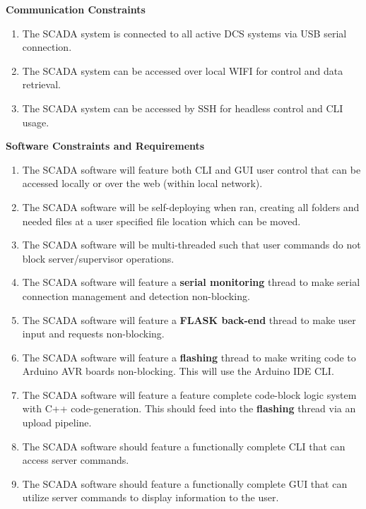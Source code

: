 \documentclass[../main.tex]{subfiles}
\begin{document}
\noindent\textbf{Communication Constraints}
\begin{enumerate}[label=\arabic*.]

\item The SCADA system is connected to all active DCS systems via USB serial connection.
\item The SCADA system can be accessed over local WIFI for control and data retrieval.
\item The SCADA system can be accessed by SSH for headless control and CLI usage.

\end{enumerate}

\noindent\textbf{Software Constraints and Requirements}
\begin{enumerate}[label=\arabic*.]

\item The SCADA software will feature both CLI and GUI user control that can be accessed locally or over the web (within local network).
\item The SCADA software will be self-deploying when ran, creating all folders and needed files at a user specified file location which can be moved.
\item The SCADA software will be multi-threaded such that user commands do not block server/supervisor operations.
\item The SCADA software will feature a \textbf{serial monitoring} thread to make serial connection management and detection non-blocking.
\item The SCADA software will feature a \textbf{FLASK back-end} thread to make user input and requests non-blocking.
\item The SCADA software will feature a \textbf{flashing} thread to make writing code to Arduino AVR boards non-blocking. This will use the Arduino IDE CLI.
\item The SCADA software will feature a feature complete code-block logic system with C++ code-generation. This should feed into the \textbf{flashing} thread via an upload pipeline.
\item The SCADA software should feature a functionally complete CLI that can access server commands.
\item The SCADA software should feature a functionally complete GUI that can utilize server commands to display information to the user.


\end{enumerate}
\end{document}

